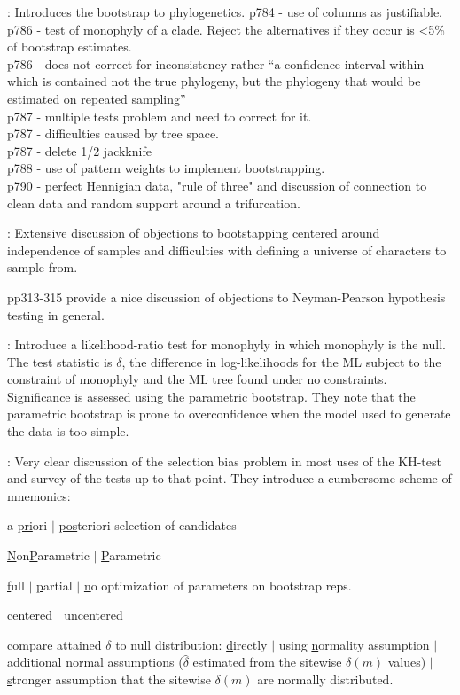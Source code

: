 \documentclass[11pt]{article}
\begin{document}
\citet{Felsenstein1985}: Introduces the bootstrap to phylogenetics.
p784 - use of columns as justifiable.\\
p786 - test of monophyly of a clade.  Reject the alternatives if they occur is <5\% of bootstrap estimates.\\
p786 - does not correct for inconsistency rather ``a confidence interval within which is contained not the true phylogeny, but the phylogeny that would be estimated on repeated sampling''\\
p787 - multiple tests problem and need to correct for it.\\
p787 - difficulties caused by tree space. \\
p787 - delete 1/2 jackknife \\
p788 - use of pattern weights to implement bootstrapping. \\
p790 - perfect Hennigian data, "rule of three" and discussion of connection to clean data and random support around a trifurcation.

\citet{Sanderson1995}: Extensive discussion of objections to bootstapping centered around independence of samples and difficulties with defining a universe of characters to sample from.
        
pp313-315 provide a nice discussion of objections to Neyman-Pearson hypothesis testing in general.      

\citet{HuelsenbeckHN1996}: Introduce a likelihood-ratio test for monophyly in which monophyly is the null.  The test statistic is $\delta$, the difference in log-likelihoods for the ML subject to the constraint of monophyly and the ML tree found under no constraints. 
Significance is assessed using the parametric bootstrap.
They note that the parametric bootstrap is prone to overconfidence when the model used to generate the data is too simple.

\citet{GoldmanAR2000}: Very clear discussion of the selection bias problem in most uses of the KH-test and survey of the tests up to that point. They introduce a cumbersome scheme of mnemonics:
\begin{compactitem}
	\item a \underline{pri}ori $|$ \underline{pos}teriori selection of candidates
	\item \underline{N}on\underline{P}arametric $|$ \underline{P}arametric
	\item \underline{f}ull $|$ \underline{p}artial $|$ \underline{n}o optimization of parameters on bootstrap reps.
	\item \underline{c}entered $|$ \underline{u}ncentered
	\item compare attained $\delta$ to null distribution: \underline{d}irectly $|$ using \underline{n}ormality assumption $|$ \underline{a}dditional normal assumptions ($\hat{\delta}$ estimated from the sitewise $\delta(m)$ values) $|$ \underline{s}tronger assumption that the sitewise $\delta(m)$ are normally distributed.
\end{compactitem}
\end{document}
